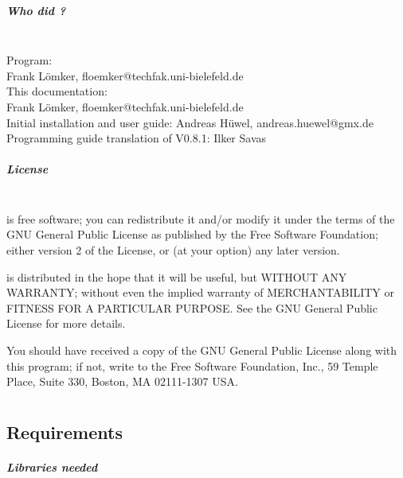 \paragraph{Who did \icewing{}?}\hfill\\
Program:\\
  \hspace*{4ex}Frank L\"omker, floemker@techfak.uni-bielefeld.de\\
This documentation:\\
  \hspace*{4ex}Frank L\"omker, floemker@techfak.uni-bielefeld.de\\
  \hspace*{4ex}Initial installation and user guide: Andreas H\"uwel, andreas.huewel@gmx.de\\
  \hspace*{4ex}Programming guide translation of V0.8.1: Ilker Savas

\paragraph{License}\hfill\\
\icewing{} is free software; you can redistribute it and/or modify
it under the terms of the GNU General Public License as published by
the Free Software Foundation; either version 2 of the License, or
(at your option) any later version.

\icewing{} is distributed in the hope that it will be useful,
but WITHOUT ANY WARRANTY; without even the implied warranty of
MERCHANTABILITY or FITNESS FOR A PARTICULAR PURPOSE. See the
GNU General Public License for more details.

You should have received a copy of the GNU General Public License
along with this program; if not, write to the Free Software
Foundation, Inc., 59 Temple Place, Suite 330, Boston, MA 02111-1307
USA.

\chapter{}
\label{chap:installation}

\section{Requirements}

\paragraph{Libraries needed}

